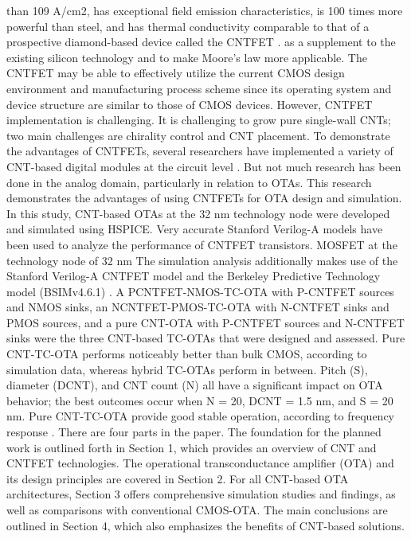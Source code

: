 than 109 A/cm2, has exceptional field emission characteristics, is 100 times
more powerful than steel, and has thermal conductivity comparable to that of a
prospective diamond-based device called the CNTFET
\cite{ref11,ref12,ref13,ref14}. as a supplement to the existing silicon
technology and to make Moore's law more applicable. The CNTFET may be able to
effectively utilize the current CMOS design environment and manufacturing
process scheme since its operating system and device structure are similar to
those of CMOS devices. However, CNTFET implementation is challenging. It is
challenging to grow pure single-wall CNTs; two main challenges are chirality
control and CNT placement. To demonstrate the advantages of CNTFETs, several
researchers have implemented a variety of CNT-based digital modules at the
circuit level
\cite{ref14,ref15,ref16,ref17,ref18,ref19,ref20,ref21,ref22,ref23}. But not much
research has been done in the analog domain, particularly in relation to OTAs.
This research demonstrates the advantages of using CNTFETs for OTA design and
simulation. In this study, CNT-based OTAs at the 32 nm technology node were
developed and simulated using HSPICE. Very accurate Stanford Verilog-A models
have been used to analyze the performance of CNTFET transistors. MOSFET at the
technology node of 32 nm The simulation analysis additionally makes use of the
Stanford Verilog-A CNTFET model and the Berkeley Predictive Technology model
(BSIMv4.6.1) \cite{ref18,ref24,ref25,ref26,ref27,ref28,ref29}.
A PCNTFET-NMOS-TC-OTA with P-CNTFET sources and NMOS sinks, an
NCNTFET-PMOS-TC-OTA with N-CNTFET sinks and PMOS sources, and a pure CNT-OTA
with P-CNTFET sources and N-CNTFET sinks were the three CNT-based TC-OTAs that
were designed and assessed. Pure CNT-TC-OTA performs noticeably better than bulk
CMOS, according to simulation data, whereas hybrid TC-OTAs perform in between.
Pitch (S), diameter (DCNT), and CNT count (N) all have a significant impact on
OTA behavior; the best outcomes occur when N = 20, DCNT = 1.5 nm, and S = 20 nm.
Pure CNT-TC-OTA provide good stable operation, according to frequency response
\cite{ref30}.
There are four parts in the paper. The foundation for the planned work is
outlined forth in Section 1, which provides an overview of CNT and CNTFET
technologies. The operational transconductance amplifier (OTA) and its design
principles are covered in Section 2. For all CNT-based OTA architectures,
Section 3 offers comprehensive simulation studies and findings, as well as
comparisons with conventional CMOS-OTA. The main conclusions are outlined in
Section 4, which also emphasizes the benefits of CNT-based solutions.
